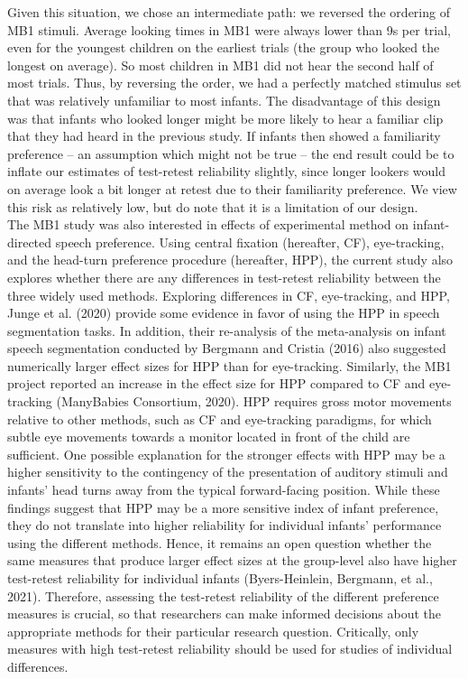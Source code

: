 \documentclass[
  man,floatsintext]{apa6}
\begin{document}
Given this situation, we chose an intermediate path: we reversed the ordering of MB1 stimuli. Average looking times in MB1 were always lower than 9s per trial, even for the youngest children on the earliest trials (the group who looked the longest on average). So most children in MB1 did not hear the second half of most trials. Thus, by reversing the order, we had a perfectly matched stimulus set that was relatively unfamiliar to most infants. The disadvantage of this design was that infants who looked longer might be more likely to hear a familiar clip that they had heard in the previous study. If infants then showed a familiarity preference -- an assumption which might not be true -- the end result could be to inflate our estimates of test-retest reliability slightly, since longer lookers would on average look a bit longer at retest due to their familiarity preference. We view this risk as relatively low, but do note that it is a limitation of our design.\\
The MB1 study was also interested in effects of experimental method on infant-directed speech preference. Using central fixation (hereafter, CF), eye-tracking, and the head-turn preference procedure (hereafter, HPP), the current study also explores whether there are any differences in test-retest reliability between the three widely used methods. Exploring differences in CF, eye-tracking, and HPP, Junge et al. (2020) provide some evidence in favor of using the HPP in speech segmentation tasks. In addition, their re-analysis of the meta-analysis on infant speech segmentation conducted by Bergmann and Cristia (2016) also suggested numerically larger effect sizes for HPP than for eye-tracking. Similarly, the MB1 project reported an increase in the effect size for HPP compared to CF and eye-tracking (ManyBabies Consortium, 2020). HPP requires gross motor movements relative to other methods, such as CF and eye-tracking paradigms, for which subtle eye movements towards a monitor located in front of the child are sufficient. One possible explanation for the stronger effects with HPP may be a higher sensitivity to the contingency of the presentation of auditory stimuli and infants' head turns away from the typical forward-facing position. While these findings suggest that HPP may be a more sensitive index of infant preference, they do not translate into higher reliability for individual infants' performance using the different methods. Hence, it remains an open question whether the same measures that produce larger effect sizes at the group-level also have higher test-retest reliability for individual infants (Byers-Heinlein, Bergmann, et al., 2021). Therefore, assessing the test-retest reliability of the different preference measures is crucial, so that researchers can make informed decisions about the appropriate methods for their particular research question. Critically, only measures with high test-retest reliability should be used for studies of individual differences.
\end{document}
